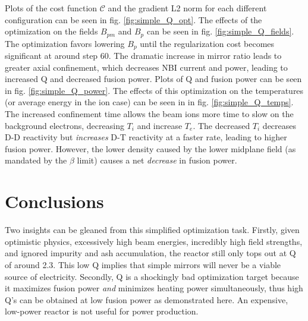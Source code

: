 Plots of the cost function $\mathcal{C}$ and the gradient L2 norm for each different configuration can be seen in fig. \ref{fig:simple_Q_opt}. The effects of the optimization on the fields $B_{pm}$ and $B_p$ can be seen in fig. \ref{fig:simple_Q_fields}. The optimization favors lowering $B_p$ until the regularization cost becomes significant at around step 60. The dramatic increase in mirror ratio leads to greater axial confinement, which decreases NBI current and power, leading to increased Q and decreased fusion power. Plots of Q and fusion power can be seen in fig. \ref{fig:simple_Q_power}. The effects of this optimization on the temperatures (or average energy in the ion case) can be seen in in fig. \ref{fig:simple_Q_temps}. The increased confinement time allows the beam ions more time to slow on the background electrons, decreasing $T_i$ and increase $T_e$. The decreased $T_i$ decreases D-D reactivity but \emph{increases} D-T reactivity at a faster rate, leading to higher fusion power. However, the lower density caused by the lower midplane field (as mandated by the $\beta$ limit) causes a net \emph{decrease} in fusion power. 

\section{Conclusions}

Two insights can be gleaned from this simplified optimization task. Firstly, given optimistic physics, excessively high beam energies, incredibly high field strengths, and ignored impurity and ash accumulation, the reactor still only tops out at Q of around 2.3. This low Q implies that simple mirrors will never be a viable source of electricity. Secondly, Q is a shockingly bad optimization target because it maximizes fusion power \emph{and} minimizes heating power simultaneously, thus high Q's can be obtained at low fusion power as demonstrated here. An expensive, low-power reactor is not useful for power production.

